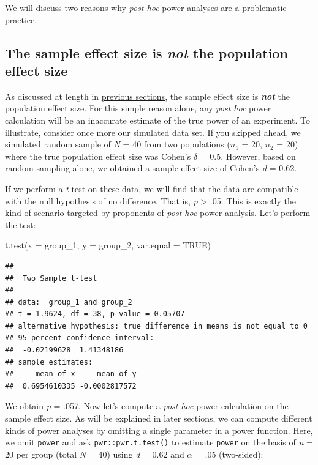 \documentclass[
]{book}
\newenvironment{Shaded}{\begin{snugshade}}{\end{snugshade}}
\newcommand{\AttributeTok}[1]{\textcolor[rgb]{0.77,0.63,0.00}{#1}}
\newcommand{\ConstantTok}[1]{\textcolor[rgb]{0.00,0.00,0.00}{#1}}
\newcommand{\FunctionTok}[1]{\textcolor[rgb]{0.00,0.00,0.00}{#1}}
\newcommand{\NormalTok}[1]{#1}
\begin{document}
We will discuss two reasons why \emph{post hoc} power analyses are a problematic practice.

\hypertarget{the-sample-effect-size-is-not-the-population-effect-size}{%
\subsection{\texorpdfstring{The sample effect size is \emph{not} the population effect size}{The sample effect size is not the population effect size}}\label{the-sample-effect-size-is-not-the-population-effect-size}}

As discussed at length in \protect\hyperlink{samp_vs_pop}{previous sections}, the sample effect size is \textbf{\emph{not}} the population effect size. For this simple reason alone, any \emph{post hoc} power calculation will be an inaccurate estimate of the true power of an experiment. To illustrate, consider once more our simulated data set. If you skipped ahead, we simulated random sample of \emph{N} = 40 from two populations (\(n_1\) = 20, \(n_2\) = 20) where the true population effect size was Cohen's \(\delta\) = 0.5. However, based on random sampling alone, we obtained a sample effect size of Cohen's \emph{d} = 0.62.

If we perform a \emph{t}-test on these data, we will find that the data are compatible with the null hypothesis of no difference. That is, \emph{p} \textgreater{} .05. This is exactly the kind of scenario targeted by proponents of \emph{post hoc} power analysis. Let's perform the test:

\begin{Shaded}
\begin{Highlighting}[]
\FunctionTok{t.test}\NormalTok{(}\AttributeTok{x =}\NormalTok{ group\_1, }\AttributeTok{y =}\NormalTok{ group\_2, }\AttributeTok{var.equal =} \ConstantTok{TRUE}\NormalTok{)}
\end{Highlighting}
\end{Shaded}

\begin{verbatim}
## 
##  Two Sample t-test
## 
## data:  group_1 and group_2
## t = 1.9624, df = 38, p-value = 0.05707
## alternative hypothesis: true difference in means is not equal to 0
## 95 percent confidence interval:
##  -0.02199628  1.41348186
## sample estimates:
##     mean of x     mean of y 
##  0.6954610335 -0.0002817572
\end{verbatim}

We obtain \emph{p} = .057. Now let's compute a \emph{post hoc} power calculation on the sample effect size. As will be explained in later sections, we can compute different kinds of power analyses by omitting a single parameter in a power function. Here, we omit \texttt{power} and ask \texttt{pwr::pwr.t.test()} to estimate \texttt{power} on the basis of \emph{n} = 20 per group (total \emph{N} = 40) using \emph{d} = 0.62 and \(\alpha\) = .05 (two-sided):
\end{document}

